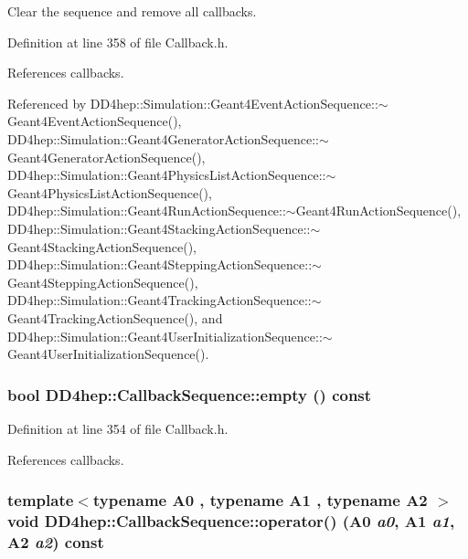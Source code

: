 Clear the sequence and remove all callbacks. 

Definition at line 358 of file Callback.h.

References callbacks.

Referenced by DD4hep::Simulation::Geant4EventActionSequence::$\sim$Geant4EventActionSequence(), DD4hep::Simulation::Geant4GeneratorActionSequence::$\sim$Geant4GeneratorActionSequence(), DD4hep::Simulation::Geant4PhysicsListActionSequence::$\sim$Geant4PhysicsListActionSequence(), DD4hep::Simulation::Geant4RunActionSequence::$\sim$Geant4RunActionSequence(), DD4hep::Simulation::Geant4StackingActionSequence::$\sim$Geant4StackingActionSequence(), DD4hep::Simulation::Geant4SteppingActionSequence::$\sim$Geant4SteppingActionSequence(), DD4hep::Simulation::Geant4TrackingActionSequence::$\sim$Geant4TrackingActionSequence(), and DD4hep::Simulation::Geant4UserInitializationSequence::$\sim$Geant4UserInitializationSequence().\hypertarget{struct_d_d4hep_1_1_callback_sequence_a3d00ddfa75fbd3e04d292eac41a8d4ea}{
\subsubsection[{empty}]{\setlength{\rightskip}{0pt plus 5cm}bool DD4hep::CallbackSequence::empty () const}}
\label{struct_d_d4hep_1_1_callback_sequence_a3d00ddfa75fbd3e04d292eac41a8d4ea}


Definition at line 354 of file Callback.h.

References callbacks.\hypertarget{struct_d_d4hep_1_1_callback_sequence_a00453acada1059910e01af33f61d9b93}{
\subsubsection[{operator()}]{\setlength{\rightskip}{0pt plus 5cm}template$<$typename A0 , typename A1 , typename A2 $>$ void DD4hep::CallbackSequence::operator() (A0 {\em a0}, \/  A1 {\em a1}, \/  A2 {\em a2}) const}}
\label{struct_d_d4hep_1_1_callback_sequence_a00453acada1059910e01af33f61d9b93}



